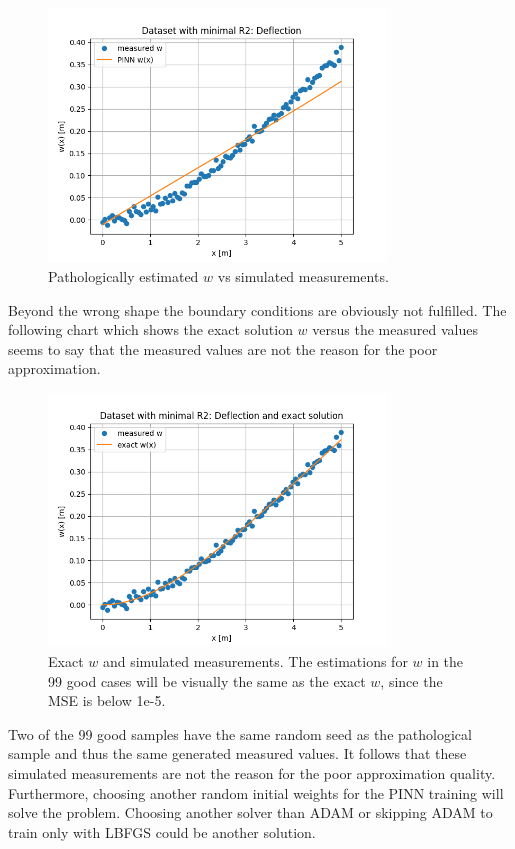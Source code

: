 \documentclass[a4paper,11pt]{article}
\begin{document}
\begin{figure}[H]
    \centering
    \includegraphics[width=0.8\textwidth]{Charts/Dataset with minimal R2Deflection_PINN.png}
    \caption{Pathologically estimated $w$ vs simulated measurements.}
\end{figure}

Beyond the wrong shape the boundary conditions are obviously not fulfilled. The following chart which shows the exact solution $w$ versus the measured values seems to say that the measured values are not the reason for the poor approximation.

\begin{figure}[H]
    \centering
    \includegraphics[width=0.8\textwidth]{Charts/Dataset with minimal R2Deflection_exact.png}
    \caption{Exact $w$ and simulated measurements. The estimations for $w$ in the 99 good cases will be visually the same as the exact $w$, since the MSE is below 1e-5.}
\end{figure}

Two of the 99 good samples have the same random seed as the pathological sample and thus the same generated measured values. It follows that these simulated measurements are not the reason for the poor approximation quality. Furthermore, choosing another random initial weights for the PINN training will solve the problem. Choosing another solver than ADAM or skipping ADAM to train only with LBFGS could be another solution.
\end{document}
